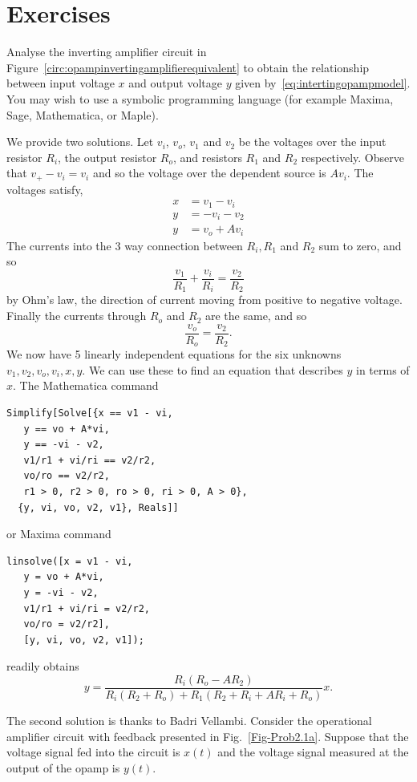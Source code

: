\section{Exercises}

\begin{excersizelist}

\item \label{exer:multiplieropampwithmodel}  Analyse the inverting amplifier circuit in Figure~\ref{circ:opampinvertingamplifierequivalent} to obtain the relationship between input voltage $x$ and output voltage $y$ given by~\eqref{eq:intertingopampmodel}.  You may wish to use a symbolic programming language (for example Maxima, Sage, Mathematica, or Maple).
\begin{solution}
We provide two solutions.  Let $v_i$, $v_o$, $v_1$ and $v_2$ be the voltages over the input resistor $R_i$, the output resistor $R_o$, and resistors $R_1$ and $R_2$ respectively.  Observe that $v_+ - v_i = v_i$ and so the voltage over the dependent source is $A v_i$.  The voltages satisfy,
\begin{align*}
x &= v_1 - v_i \\
y &= -v_i - v_2 \\
y &=  v_o + Av_i
\end{align*}
The currents into the 3 way connection between $R_i, R_1$ and $R_2$ sum to zero, and so
\[
\frac{v_1}{R_1} + \frac{v_i}{R_i} = \frac{v_2}{R_2}
\]
by Ohm's law, the direction of current moving from positive to negative voltage.  Finally the currents through $R_o$ and $R_2$ are the same, and so
\[
\frac{v_o}{R_o} = \frac{v_2}{R_2}.
\]
We now have 5 linearly independent equations for the six unknowns $v_1, v_2, v_o, v_i, x, y$.  We can use these to find an equation that describes $y$ in terms of $x$.  The Mathematica command
\begin{verbatim}
Simplify[Solve[{x == v1 - vi,
   y == vo + A*vi,
   y == -vi - v2,
   v1/r1 + vi/ri == v2/r2,
   vo/ro == v2/r2,
   r1 > 0, r2 > 0, ro > 0, ri > 0, A > 0},
  {y, vi, vo, v2, v1}, Reals]]
\end{verbatim}
or Maxima command
\begin{verbatim}
linsolve([x = v1 - vi,
   y = vo + A*vi,
   y = -vi - v2,
   v1/r1 + vi/ri = v2/r2,
   vo/ro = v2/r2],
   [y, vi, vo, v2, v1]);
\end{verbatim}
readily obtains
\[
y = \frac{R_i (R_o - A R_2) }{R_i (R_2+R_o)+R_1 (R_2+R_i + A R_i+R_o)}x.
\]

The second solution is thanks to Badri Vellambi.  Consider the operational amplifier circuit with feedback presented in Fig.~\ref{Fig-Prob2.1a}. Suppose that the voltage signal fed into the circuit is $x(t)$ and the voltage signal measured at the output of the opamp is $y(t)$. 


\end{solution}
\end{excersizelist}
